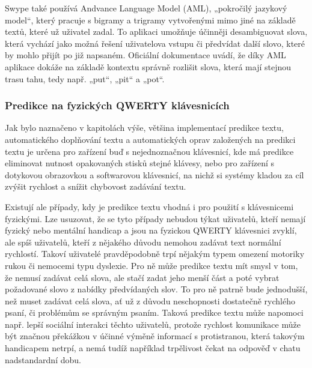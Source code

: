 \documentclass[a4paper,11pt]{article}
\begin{document}

Swype také používá Andvance Language Model (AML), „pokročilý jazykový model“, který pracuje s bigramy a trigramy vytvořenými mimo jiné na základě textů, které už uživatel zadal. To aplikaci umožňuje účinněji desambiguovat slova, která vychází jako možná řešení uživatelova vstupu či předvídat další slovo, které by mohlo přijít po již napsaném. Oficiální dokumentace uvádí, že díky AML aplikace dokáže na základě kontextu správně rozlišit slova, která mají stejnou trasu tahu, tedy např. „put“, „pit“ a „pot“.

\subsubsection{Predikce na fyzických QWERTY klávesnicích}

Jak bylo naznačeno v kapitolách výše, většina implementací predikce textu, automatického doplňování textu a automatických oprav založených na predikci textu je určena pro zařízení buď s nejednoznačnou klávesnicí, kde má predikce eliminovat nutnost opakovaných stisků stejné klávesy, nebo pro zařízení s dotykovou obrazovkou a softwarovou klávesnicí, na nichž si systémy kladou za cíl zvýšit rychlost a snížit chybovost zadávání textu. 

Existují ale případy, kdy je predikce textu vhodná i pro použití s klávesnicemi fyzickými. Lze usuzovat, že se tyto případy nebudou týkat uživatelů, kteří nemají fyzický nebo mentální handicap a jsou na fyzickou QWERTY klávesnici zvyklí, ale spíš uživatelů, kteří z nějakého důvodu nemohou zadávat text normální rychlostí. Takoví uživatelé pravděpodobně trpí nějakým typem omezení motoriky rukou či nemocemi typu dyslexie. Pro ně může predikce textu mít smysl v tom, že nemusí zadávat celá slova, ale stačí zadat jeho menší část a poté vybrat požadované slovo z nabídky předvídaných slov. To pro ně patrně bude jednodušší, než muset zadávat celá slova, ať už z důvodu neschopnosti dostatečně rychlého psaní, či problémům se správným psaním.  Taková predikce textu může napomoci např. lepší sociální interakci těchto uživatelů, protože rychlost komunikace může být značnou překážkou v účinné výměně informací s protistranou, která takovým handicapem netrpí, a nemá tudíž například trpělivost čekat na odpověď v chatu nadstandardní dobu. %
\end{document}
